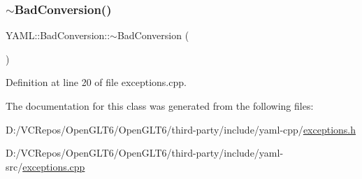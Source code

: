 \mbox{\label{class_y_a_m_l_1_1_bad_conversion_a95693c5708a5e35969e0010dbcd5ef36}} 
\subsubsection{\texorpdfstring{$\sim$BadConversion()}{~BadConversion()}}
{\footnotesize\ttfamily Y\+A\+M\+L\+::\+Bad\+Conversion\+::$\sim$\+Bad\+Conversion (\begin{DoxyParamCaption}{ }\end{DoxyParamCaption})\hspace{0.3cm}{\ttfamily [virtual]}}



Definition at line 20 of file exceptions.\+cpp.



The documentation for this class was generated from the following files\+:\begin{DoxyCompactItemize}
\item 
D\+:/\+V\+C\+Repos/\+Open\+G\+L\+T6/\+Open\+G\+L\+T6/third-\/party/include/yaml-\/cpp/\mbox{\hyperlink{exceptions_8h}{exceptions.\+h}}\item 
D\+:/\+V\+C\+Repos/\+Open\+G\+L\+T6/\+Open\+G\+L\+T6/third-\/party/include/yaml-\/src/\mbox{\hyperlink{exceptions_8cpp}{exceptions.\+cpp}}\end{DoxyCompactItemize}
